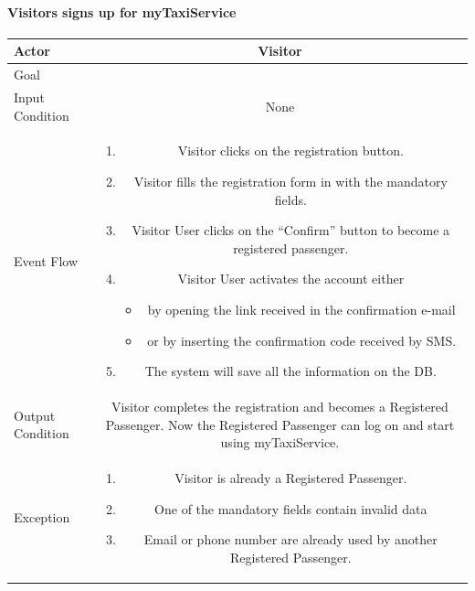 \documentclass[a4paper,12pt]{article}%
\newcommand{\usecasetable}[6]{
\begin{center}
\def\arraystretch{1.5}
\begin{tabularx}{\textwidth}{|s|C|}
\hline
Actor & #1\\
\hline
Goal & #2\\
\hline
Input Condition & #3 \\
\hline
Event Flow & #4\\
\hline
Output Condition & #5\\
\hline
Exception & #6\\
\hline
\end{tabularx}
\end{center}
}
\begin{document}
\paragraph{Visitors signs up for myTaxiService}
\usecasetable {Visitor} {} {None} {
\begin{minipage}[b]{11cm}
\begin{enumerate}
\item Visitor clicks on the registration button.
\item Visitor fills the registration form in with the mandatory fields.
\item Visitor User clicks on the ``Confirm'' button to become a registered passenger. 
\item Visitor User activates the account either
\begin{itemize}
\item by opening the link received in the confirmation e-mail
\item or by inserting the confirmation code received by SMS.
\end{itemize}
\item The system will save all the information on the DB.
\end{enumerate}
\end{minipage}} 
{
Visitor completes the registration and becomes a Registered Passenger.
Now the Registered Passenger can log on and start using myTaxiService.
} 
{
\begin{minipage}[b]{11cm}
\begin{enumerate}
\item Visitor is already a Registered Passenger.
\item One of the mandatory fields contain invalid data
\item Email or phone number are already used by another Registered Passenger.
\end{enumerate}
\end{minipage}
}
\end{document}
